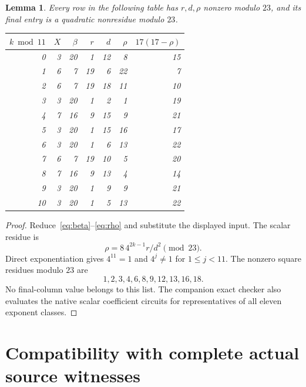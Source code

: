 \documentclass[11pt,a4paper]{article}
\newtheorem{lemma}[theorem]{Lemma}
\begin{document}
\begin{lemma}\label{lem:table}
Every row in the following table has $r,d,\rho$ nonzero modulo $23$,
and its final entry is a quadratic nonresidue modulo $23$.
\begin{center}
\normalfont
\begin{tabular}{rrrrrrr}\toprule
$k\bmod11$&$X$&$\beta$&$r$&$d$&$\rho$&$17(17-\rho)$\\\midrule
0&3&20&1&12&8&15\\
1&6&7&19&6&22&7\\
2&6&7&19&18&11&10\\
3&3&20&1&2&1&19\\
4&7&16&9&15&9&21\\
5&3&20&1&15&16&17\\
6&3&20&1&6&13&22\\
7&6&7&19&10&5&20\\
8&7&16&9&13&4&14\\
9&3&20&1&9&9&21\\
10&3&20&1&5&13&22\\\bottomrule
\end{tabular}
\end{center}
\end{lemma}
\begin{proof}
Reduce~\eqref{eq:beta}--\eqref{eq:rho} and substitute the displayed
input. The scalar residue is
\[
                \rho=8\,4^{2k-1}r/d^2\pmod{23}.
\]
Direct exponentiation gives $4^{11}=1$ and $4^j\ne1$ for
$1\le j<11$. The nonzero square residues modulo $23$ are
\[
                    1,2,3,4,6,8,9,12,13,16,18.
\]
No final-column value belongs to this list. The companion exact checker
also evaluates the native scalar coefficient circuits for representatives
of all eleven exponent classes.
\end{proof}

\section{Compatibility with complete actual source witnesses}
\end{document}
